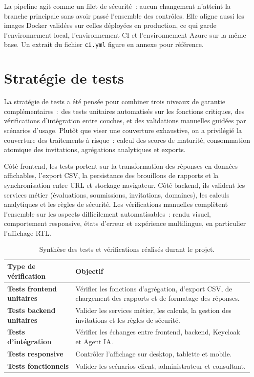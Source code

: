 \documentclass[12pt,a4paper]{report}
\begin{document}
La pipeline agit comme un filet de sécurité~: aucun changement n'atteint la branche principale sans avoir passé l'ensemble des contrôles. Elle aligne aussi les images Docker validées sur celles déployées en production, ce qui garde l'environnement local, l'environnement CI et l'environnement Azure sur la même base. Un extrait du fichier \texttt{ci.yml} figure en annexe pour référence.

\section{Stratégie de tests}
La stratégie de tests a été pensée pour combiner trois niveaux de garantie complémentaires~: des tests unitaires automatisés sur les fonctions critiques, des vérifications d'intégration entre couches, et des validations manuelles guidées par scénarios d'usage. Plutôt que viser une couverture exhaustive, on a privilégié la couverture des traitements à risque~: calcul des scores de maturité, consommation atomique des invitations, agrégations analytiques et exports.

Côté frontend, les tests portent sur la transformation des réponses en données affichables, l'export CSV, la persistance des brouillons de rapports et la synchronisation entre URL et stockage navigateur. Côté backend, ils valident les services métier (évaluations, soumissions, invitations, domaines), les calculs analytiques et les règles de sécurité. Les vérifications manuelles complètent l'ensemble sur les aspects difficilement automatisables~: rendu visuel, comportement responsive, états d'erreur et expérience multilingue, en particulier l'affichage RTL.

\begin{table}[H]
\centering
\caption{Synthèse des tests et vérifications réalisés durant le projet.}
\begin{tabularx}{\textwidth}{>{\bfseries}L{4cm}Y}
\toprule
Type de vérification & Objectif \\
\midrule
Tests frontend unitaires & Vérifier les fonctions d'agrégation, d'export CSV, de chargement des rapports et de formatage des réponses. \\
Tests backend unitaires & Valider les services métier, les calculs, la gestion des invitations et les règles de sécurité. \\
Tests d'intégration & Vérifier les échanges entre frontend, backend, Keycloak et Agent IA. \\
Tests responsive & Contrôler l'affichage sur desktop, tablette et mobile. \\
Tests fonctionnels & Valider les scénarios client, administrateur et consultant. \\
\bottomrule
\end{tabularx}
\end{table}
\end{document}

